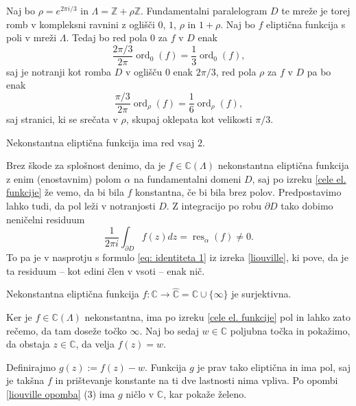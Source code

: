 \documentclass[mat1]{fmfdelo}
\numberwithin{equation}{section}
\newcommand{\Z}{\mathbb Z}
\newcommand{\C}{\mathbb C}
\newcommand{\RS}{\widehat{\C}}
\newcommand{\elf}{\C(\Lambda)}
\newcommand{\res}[2]{\operatorname{res}_{#1}(#2)}
\newcommand{\ord}[2]{\operatorname{ord}_{#1}(#2)}
\theoremstyle{definition}
\begin{document}
\begin{zgled*}
    Naj bo $\rho = e^{2\pi i /3}$ in $\Lambda = \Z + \rho\Z$. Fundamentalni paralelogram $D$ te mreže je torej romb v kompleksni ravnini z oglišči $0$, $1$, $\rho$ in $1 + \rho$. Naj bo $f$ eliptična funkcija s poli v mreži $\Lambda$. Tedaj bo red pola $0$ za $f$ v $D$ enak
    \[
        \frac{2\pi/3}{2\pi}\ord{0}{f} = \frac{1}{3}\ord{0}{f},
    \]
    saj je notranji kot romba $D$ v oglišču $0$ enak $2\pi/3$, red pola $\rho$ za $f$ v $D$ pa bo enak
    \[
        \frac{\pi/3}{2\pi}\ord{\rho}{f} = \frac{1}{6}\ord{\rho}{f},
    \]
    saj stranici, ki se srečata v $\rho$, skupaj oklepata kot velikosti $\pi/3$.
\end{zgled*}

\begin{posledica}
    \label{poseldica o redu elipticne funkcije}
    Nekonstantna eliptična funkcija ima red vsaj $2$.
\end{posledica}

\begin{dokaz}
    Brez škode za splošnost denimo, da je $f \in \elf$ nekonstantna eliptična funkcija z enim (enostavnim) polom $\alpha$ na fundamentalni domeni $D$, saj po izreku \ref{cele el. funkcije} že vemo, da bi bila $f$ konstantna, če bi bila brez polov. 
    Predpostavimo lahko tudi, da pol leži v notranjosti $D$. Z integracijo po robu $\partial D$ tako dobimo neničelni residuum
    \[
        \frac{1}{2 \pi i} \int_{\partial D} f(z)dz = \res{\alpha}{f} \neq 0.  
    \]
    To pa je v nasprotju s formulo \eqref{eq: identiteta 1} iz izreka \ref{liouville}, ki pove, da je ta residuum -- kot edini člen v vsoti -- enak nič. 
\end{dokaz}

\begin{posledica}
    \label{elipticna funkcija je surjektivna}
    Nekonstantna eliptična funkcija $f: \C \to \RS = \C \cup \{\infty\}$ je surjektivna. 
\end{posledica}

\begin{dokaz}
    Ker je $f \in \elf$ nekonstantna, ima po izreku \ref{cele el. funkcije} pol in lahko zato rečemo, da tam doseže točko $\infty$. Naj bo sedaj $w \in \C$ poljubna točka in pokažimo, da obstaja $z \in \C$, da velja $f(z) = w$.
    
    Definirajmo $g(z) := f(z) - w$. Funkcija $g$ je prav tako eliptična in ima pol, saj je takšna $f$ in prištevanje konstante na ti dve lastnosti nima vpliva. Po opombi \ref{liouville opomba} (3) ima $g$ ničlo v $\C$, kar pokaže želeno.
\end{dokaz}
\end{document}

